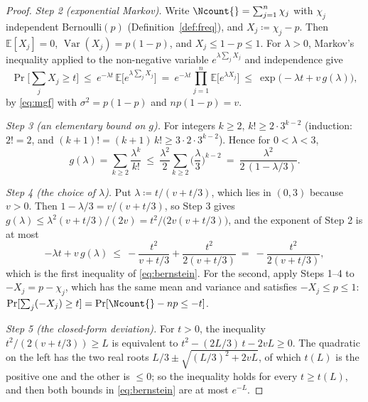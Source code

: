 \begin{proof}
\emph{Step 2 (exponential Markov).} Write $\Ncount{}=\sum_{j=1}^{n}\chi_j$ with
$\chi_j$ independent Bernoulli$(p)$ (Definition~\ref{def:freq}), and
$X_j\coloneqq\chi_j-p$. Then $\mathbb{E}[X_j]=0$,
$\operatorname{Var}(X_j)=p(1-p)$, and $X_j\le1-p\le1$. For $\lambda>0$,
Markov's inequality applied to the non-negative variable
$e^{\lambda\sum_jX_j}$ and independence give
\begin{equation*}
  \Pr\Big[\sum_{j}X_j\ge t\Big]
  \ \le\ e^{-\lambda t}\,\mathbb{E}\Big[e^{\lambda\sum_jX_j}\Big]
  \ =\ e^{-\lambda t}\prod_{j=1}^{n}\mathbb{E}\big[e^{\lambda X_j}\big]
  \ \le\ \exp\big(-\lambda t+v\,g(\lambda)\big),
\end{equation*}
by \eqref{eq:mgf} with $\sigma^{2}=p(1-p)$ and $np(1-p)=v$.

\emph{Step 3 (an elementary bound on $g$).} For integers $k\ge2$,
$k!\ge2\cdot3^{k-2}$ (induction: $2!=2$, and
$(k+1)!=(k+1)\,k!\ge3\cdot2\cdot3^{k-2}$). Hence for $0<\lambda<3$,
\begin{equation*}
  g(\lambda)=\sum_{k\ge2}\frac{\lambda^{k}}{k!}
  \ \le\ \frac{\lambda^{2}}{2}\sum_{k\ge2}\Big(\frac{\lambda}{3}\Big)^{k-2}
  \ =\ \frac{\lambda^{2}}{2\,(1-\lambda/3)}.
\end{equation*}

\emph{Step 4 (the choice of $\lambda$).} Put
$\lambda\coloneqq t/(v+t/3)$, which lies in $(0,3)$ because $v>0$. Then
$1-\lambda/3=v/(v+t/3)$, so Step 3 gives
$g(\lambda)\le\lambda^{2}(v+t/3)/(2v)=t^{2}/\big(2v(v+t/3)\big)$, and the
exponent of Step 2 is at most
\begin{equation*}
  -\lambda t+v\,g(\lambda)
  \ \le\ -\frac{t^{2}}{v+t/3}+\frac{t^{2}}{2(v+t/3)}
  \ =\ -\frac{t^{2}}{2(v+t/3)},
\end{equation*}
which is the first inequality of \eqref{eq:bernstein}. For the second, apply
Steps 1--4 to $-X_j=p-\chi_j$, which has the same mean and variance and
satisfies $-X_j\le p\le1$: $\Pr[\sum_j(-X_j)\ge t]=\Pr[\Ncount{}-np\le-t]$.

\emph{Step 5 (the closed-form deviation).} For $t>0$, the inequality
$t^{2}/(2(v+t/3))\ge L$ is equivalent to $t^{2}-(2L/3)\,t-2vL\ge0$. The
quadratic on the left has the two real roots $L/3\pm\sqrt{(L/3)^{2}+2vL}$, of
which $t(L)$ is the positive one and the other is $\le0$; so the inequality
holds for every $t\ge t(L)$, and then both bounds in \eqref{eq:bernstein}
are at most $e^{-L}$.
\end{proof}
